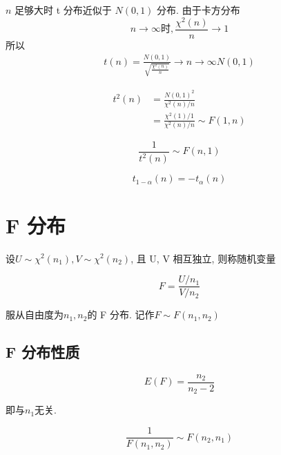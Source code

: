 \begin{corollary}
    $n$ 足够大时 t 分布近似于 $N(0,1)$ 分布. 由于卡方分布
    $$
        n\to \infty 时, \frac{\chi^2(n)}{n} \to 1
    $$
    所以
    $$
        \begin{aligned}
            t(n) =
            {\frac{N(0,1)}{\sqrt{\frac{\chi^2(n)}{n}}}
            \rightarrow{n \to \infty}
            N(0,1)}
        \end{aligned}
    $$
\end{corollary}

\begin{corollary}[与 F 分布的关系]
    $$
        \begin{aligned}
            t^2(n) & = \frac{N(0,1)^2}{\chi^2 (n)/n}                    \\
                   & = \frac{\chi ^2(1)/1}{ \chi ^2(n) / n} \sim F(1,n)
        \end{aligned}
    $$

    $$
        \frac{1}{t^2(n)} \sim F(n,1)
    $$
\end{corollary}

\begin{definition}[t 分布的上分位点]
    $$
        t_{1-\alpha} (n) = -t_\alpha(n)
    $$
\end{definition}

\section{F 分布}

\begin{definition}[F 分布]
    设$U \sim \chi^2(n_1), V \sim \chi^2(n_2)$, 且 U, V 相互独立, 则称随机变量

    $$
        F = \frac{U/n_1}{V/n_2}
    $$

    服从自由度为$n_1,n_2$的 F 分布. 记作$F \sim F(n_1,n_2)$
\end{definition}

\subsection{F 分布性质}

\begin{corollary}[F 分布数学期望]
    $$
        E(F) =\frac{{ n_2} }{{ n_2}  - 2}
    $$

    即与$n_1$无关.
\end{corollary}

\begin{corollary}[$F(n_1,n_2),F(n_2,n_1)$的关系]
    $$
        \frac{1}{F(n_1,n_2)} \sim F(n_2,n_1)
    $$
\end{corollary}


